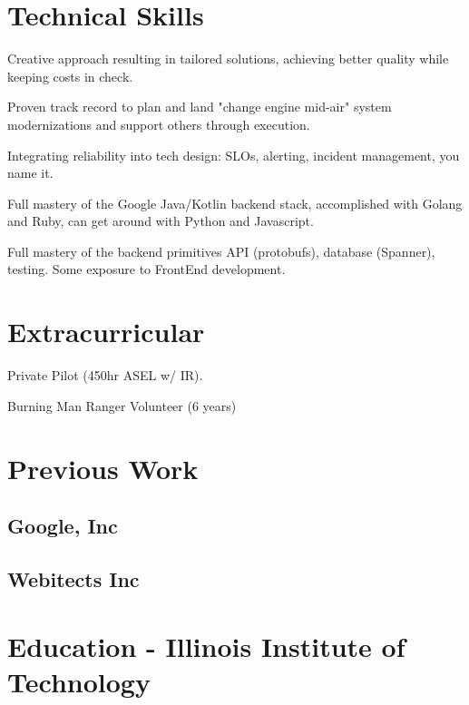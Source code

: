\documentclass{resume}
\newcommand{\textapprox}{\raisebox{0.5ex}{\texttildelow}}
\begin{document}
\section{Technical Skills}
\begin{compactitem}
  \item Creative approach resulting in tailored solutions, achieving better quality while keeping costs in check.
  \item Proven track record to plan and land "change engine mid-air" system modernizations and support others through execution.
  \item Integrating reliability into tech design: SLOs, alerting, incident management, you name it.
  \item Full mastery of the Google Java/Kotlin backend stack, accomplished with Golang and Ruby, can get around with Python and Javascript.
  \item Full mastery of the backend primitives API (protobufs), database (Spanner), testing. Some exposure to FrontEnd development.
\end{compactitem}

\section{Extracurricular}
\begin{compactitem}
  \item Private Pilot (\textapprox 450hr ASEL w/ IR).
  \item Burning Man Ranger Volunteer (6 years)
\end{compactitem}

\section{Previous Work}

\subsection{Google, Inc}


\subsection{Webitects Inc}


\section{Education - Illinois Institute of Technology}

\end{document}
